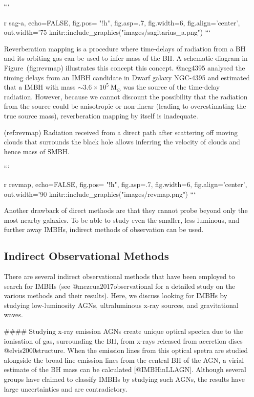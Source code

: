 {{{{```{r sag-a, echo=FALSE, fig.pos= "!h", fig.asp=.7, fig.width=6, fig.align='center', out.width='75%
knitr::include_graphics("images/sagitarius_a.png")
```

Reverberation mapping is a procedure where time-delays of radiation from
a BH and its orbiting gas can be used to infer mass of the BH. A
schematic diagram in Figure~\@ref(fig:revmap) illustrates this concept
this concept. @ncg4395 analysed the timing delays from an IMBH candidate
in Dwarf galaxy NGC-4395 and estimated that a IMBH with mass
${\sim3.6\times10^5\ \text{M}_{\odot}}$ was the source of the time-delay
radiation. However, because we cannot discount the possibility that the
radiation from the source could be anisotropic or non-linear (leading to
overestimating the true source mass), reverberation mapping by
itself is inadequate.


(ref:revmap) Radiation received from a direct path after scattering off moving clouds that surrounds the black hole allows inferring the velocity of clouds and hence mass of SMBH.

```{r revmap, echo=FALSE, fig.pos= "!h", fig.asp=.7, fig.width=6, fig.align='center', out.width='90%
knitr::include_graphics("images/revmap.png")
```

Another drawback of direct methods are that they cannot probe beyond
only the most nearby galaxies. To be able to study even the smaller, less
luminous, and further away IMBHs, indirect methods of observation can be
used.

\subsection{Indirect Observational Methods}

There are several indirect observational methods that have been employed
to search for IMBHs (see @mezcua2017observational for a detailed
study on the various methods and their results). Here, we discuss
looking for IMBHs by studying low-luminosity AGNs, ultraluminous x-ray
sources, and gravitational waves.

#### Studying x-ray emission
AGNs create unique optical spectra due to the ionisation of gas,
surrounding the BH, from x-rays released from accretion discs
@elvis2000structure. When the emission lines from this optical spetra are
studied alongside the broad-line emission lines from the central BH of
the AGN, a virial estimate of the BH mass can be calculated
[@IMBHinLLAGN]. Although several groups have claimed to classify IMBHs
by studying such AGNs, the results have large uncertainties and are
contradictory.

}}}}}}
